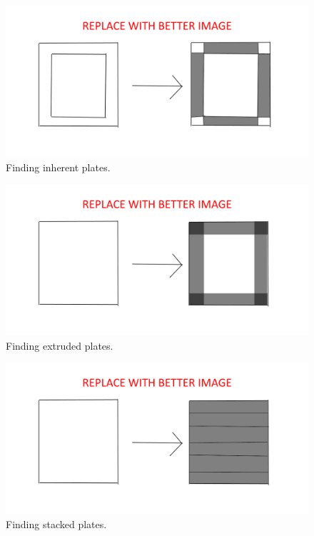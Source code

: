 \documentclass[../ClassicThesis.tex]{subfiles}
\begin{document}
\begin{figure}
    \centering
    \includegraphics[width=1.0\columnwidth]{Images/plates_inherentplates.png}
    \caption{Finding inherent plates.}
    \label{fig:inhplates}
\end{figure}

\begin{figure}
    \centering
    \includegraphics[width=1.0\columnwidth]{Images/plates_extrudedplates.png}
    \caption{Finding extruded plates.}
    \label{fig:extplates}
\end{figure}

\begin{figure}
    \centering
    \includegraphics[width=1.0\columnwidth]{Images/plates_stackedplates.png}
    \caption{Finding stacked plates.}
    \label{fig:staplates}
\end{figure}
\end{document}
